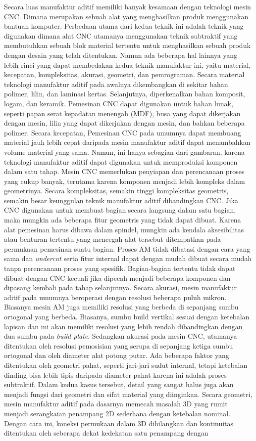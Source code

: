 Secara luas manufaktur aditif memiliki banyak kesamaan dengan teknologi mesin CNC. Dimana merupakan sebuah alat yang menghasilkan produk menggunakan bantuan komputer. Perbedaan utama dari kedua teknik ini adalah teknik yang digunakan dimana alat CNC utamanya menggunakan teknik subtraktif yang membutuhkan sebuah blok material tertentu untuk menghasilkan sebuah produk dengan desain yang telah ditentukan. Namun ada beberapa hal lainnya yang lebih rinci yang dapat membedakan kedua teknik manufaktur ini, yaitu material, kecepatan, kompleksitas, akurasi, geometri, dan pemrograman. Secara material teknologi manufaktur aditif pada awalnya dikembangkan di sekitar bahan polimer, lilin, dan laminasi kertas. Selanjutnya, diperkenalkan bahan komposit, logam, dan keramik. Pemesinan CNC dapat digunakan untuk bahan lunak, seperti papan serat kepadatan menengah (MDF), busa yang dapat dikerjakan dengan mesin, lilin yang dapat dikerjakan dengan mesin, dan bahkan beberapa polimer. Secara kecepatan, Pemesinan CNC pada umumnya dapat membuang material jauh lebih cepat daripada mesin manufaktur aditif dapat menambahkan volume material yang sama. Namun, ini hanya sebagian dari gambaran, karena teknologi manufaktur aditif dapat digunakan untuk memproduksi komponen dalam satu tahap. Mesin CNC memerlukan penyiapan dan perencanaan proses yang cukup banyak, terutama karena komponen menjadi lebih kompleks dalam geometrinya. Secara kompleksitas, semakin tinggi kompleksitas geometris, semakin besar keunggulan teknik manufaktur aditif dibandingkan CNC. Jika CNC digunakan untuk membuat bagian secara langsung dalam satu bagian, maka mungkin ada beberapa fitur geometris yang tidak dapat dibuat. Karena alat pemesinan harus dibawa dalam spindel, mungkin ada kendala aksesibilitas atau benturan tertentu yang mencegah alat tersebut ditempatkan pada permukaan pemesinan suatu bagian. Proses AM tidak dibatasi dengan cara yang sama dan \textit{undercut} serta fitur internal dapat dengan mudah dibuat secara mudah tanpa perencanaan proses yang spesifik. Bagian-bagian tertentu tidak dapat dibuat dengan CNC kecuali jika dipecah menjadi beberapa komponen dan dipasang kembali pada tahap selanjutnya. Secara akurasi, mesin manufaktur aditif pada umumnya beroperasi dengan resolusi beberapa puluh mikron. Biasanya mesin AM juga memiliki resolusi yang berbeda di sepanjang sumbu ortogonal yang berbeda. Biasanya, sumbu build vertikal sesuai dengan ketebalan lapisan dan ini akan memiliki resolusi yang lebih rendah dibandingkan dengan dua sumbu pada \textit{build plate}.  Sedangkan akurasi pada mesin CNC, utamanya ditentukan oleh resolusi pemosisian yang serupa di sepanjang ketiga sumbu ortogonal dan oleh diameter alat potong putar. Ada beberapa faktor yang ditentukan oleh geometri pahat, seperti jari-jari sudut internal, tetapi ketebalan dinding bisa lebih tipis daripada diameter pahat karena ini adalah proses subtraktif. Dalam kedua kasus tersebut, detail yang sangat halus juga akan menjadi fungsi dari geometri dan sifat material yang diinginkan. Secara geometri, mesin manufaktur aditif pada dasarnya memecah masalah 3D yang rumit menjadi serangkaian penampang 2D sederhana dengan ketebalan nominal. Dengan cara ini, koneksi permukaan dalam 3D dihilangkan dan kontinuitas ditentukan oleh seberapa dekat kedekatan satu penampang dengan 
